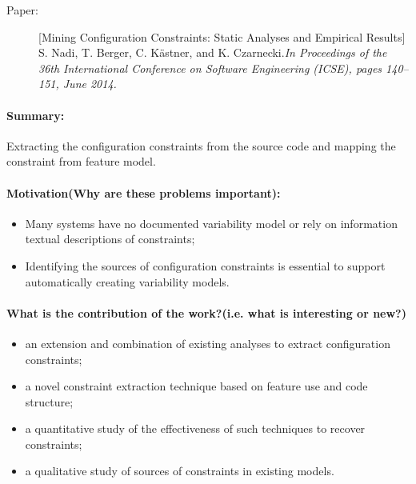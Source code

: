 \documentclass[12pt]{article}
\begin{document}
\clearpage
\begin{description}
\item[Paper:] [Mining Configuration Constraints: Static Analyses and Empirical Results] S. Nadi, T. Berger, C. Kästner, and K. Czarnecki.\emph{In Proceedings of the 36th International Conference on Software Engineering (ICSE), pages 140--151, June 2014.} 
\end{description}

\paragraph{Summary:} Extracting the configuration constraints from the source code and mapping the constraint from feature model.

\paragraph{Motivation(Why are these problems important):}
\begin{itemize}
	\item Many systems have no documented variability model or rely on information textual descriptions of constraints;
	\item Identifying the sources of configuration constraints is essential to support automatically creating variability models.
\end{itemize}


\paragraph{What is the contribution of the work?(i.e. what is interesting or new?)}
\begin{itemize}
	\item an extension and combination of existing analyses to extract configuration constraints;
	\item a novel constraint extraction technique based on feature use and code structure;
	\item a quantitative study of the effectiveness of such techniques to recover constraints;
	\item a qualitative study of sources of constraints in existing models.
\end{itemize}
\end{document}

